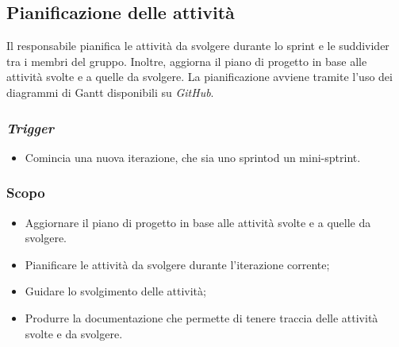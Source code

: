 \subsection{Pianificazione delle attività}
\label{pianificazione-attivia}

Il responsabile pianifica le attività da svolgere durante lo sprint
e le suddivider tra i membri del gruppo. Inoltre, aggiorna il piano di progetto
in base alle attività svolte e a quelle da svolgere. La pianificazione avviene
tramite l'uso dei diagrammi di Gantt disponibili su \textit{GitHub}.

\subsubsection{\textit{Trigger}}
\begin{itemize}
	\item Comincia una nuova iterazione, che sia uno sprint\g od un
	      mini-sptrint\g.
\end{itemize}

\subsubsection{Scopo}
\begin{itemize}
	\item Aggiornare il piano di progetto in base alle attività svolte e a
	      quelle da svolgere.

	\item Pianificare le attività da svolgere durante l'iterazione corrente;

	\item Guidare lo svolgimento delle attività;

	\item Produrre la documentazione che permette di tenere traccia delle
	      attività svolte e da svolgere.
\end{itemize}

